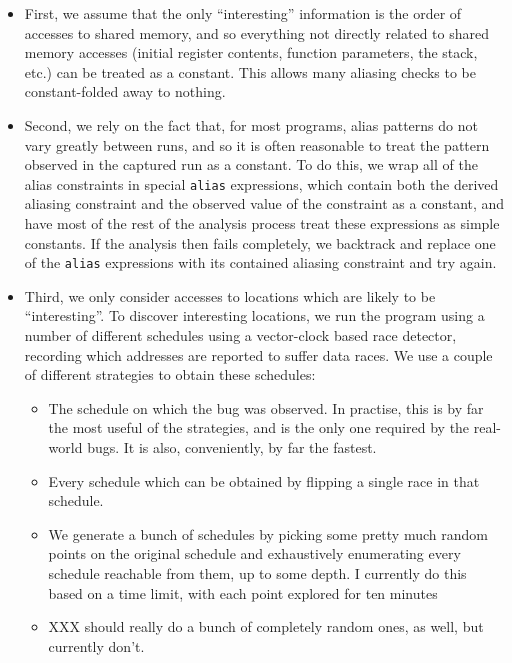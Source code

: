 \documentclass[10pt,a4paper]{report}
\begin{document}
\begin{itemize}
\item First, we assume that the only ``interesting'' information is
  the order of accesses to shared memory, and so everything not
  directly related to shared memory accesses (initial register
  contents, function parameters, the stack, etc.) can be treated as a
  constant.  This allows many aliasing checks to be constant-folded
  away to nothing.

\item Second, we rely on the fact that, for most programs, alias
  patterns do not vary greatly between runs, and so it is often
  reasonable to treat the pattern observed in the captured run as a
  constant.  To do this, we wrap all of the alias constraints in
  special \verb|alias| expressions, which contain both the derived
  aliasing constraint and the observed value of the constraint as a
  constant, and have most of the rest of the analysis process treat
  these expressions as simple constants.  If the analysis then fails
  completely, we backtrack and replace one of the \verb|alias|
  expressions with its contained aliasing constraint and try
  again.

\item Third, we only consider accesses to locations which are likely
  to be ``interesting''.  To discover interesting locations, we run
  the program using a number of different schedules using a
  vector-clock based race detector, recording which addresses are
  reported to suffer data races.  We use a couple of different
  strategies to obtain these schedules:

  \begin{itemize}
  \item The schedule on which the bug was observed.  In practise, this
    is by far the most useful of the strategies, and is the only one
    required by the real-world bugs.  It is also, conveniently, by far
    the fastest.
  \item Every schedule which can be obtained by flipping a single race
    in that schedule.
  \item We generate a bunch of schedules by picking some pretty much
    random points on the original schedule and exhaustively
    enumerating every schedule reachable from them, up to some depth.
    I currently do this based on a time limit, with each point
    explored for ten minutes
  \item XXX should really do a bunch of completely random ones, as
    well, but currently don't.
  \end{itemize}


\end{itemize}
\end{document}
